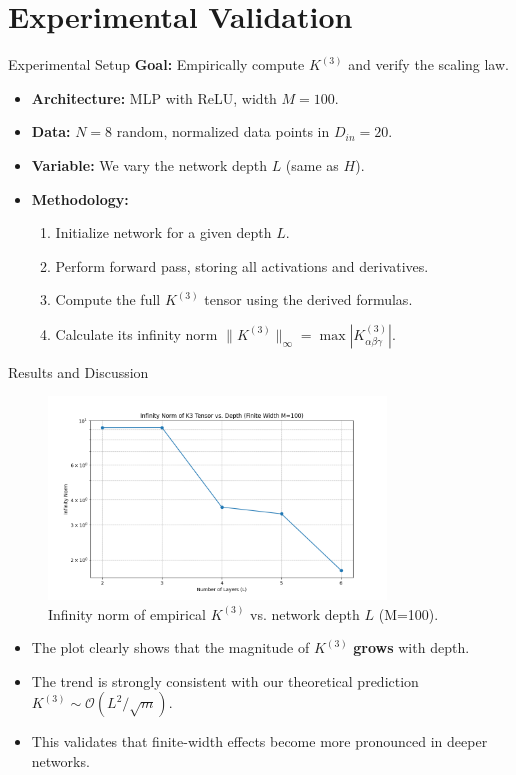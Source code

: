 \documentclass{beamer}
\newcommand{\Order}{\mathcal{O}}
\begin{document}
\section{Experimental Validation}

\begin{frame}{Experimental Setup}
\textbf{Goal:} Empirically compute $K^{(3)}$ and verify the scaling law.
\begin{itemize}
    \item \textbf{Architecture:} MLP with ReLU, width $M=100$.
    \item \textbf{Data:} $N=8$ random, normalized data points in $D_{in}=20$.
    \item \textbf{Variable:} We vary the network depth $L$ (same as $H$).
    \item \textbf{Methodology:}
        \begin{enumerate}
            \item Initialize network for a given depth $L$.
            \item Perform forward pass, storing all activations and derivatives.
            \item Compute the full $K^{(3)}$ tensor using the derived formulas.
            \item Calculate its infinity norm $\|K^{(3)}\|_\infty = \max |K^{(3)}_{\alpha\beta\gamma}|$.
        \end{enumerate}
\end{itemize}
\end{frame}

\begin{frame}{Results and Discussion}
\begin{figure}[h]
    \centering
    \includegraphics[width=0.8\textwidth]{../../../experiments/plots/k3_inf_norm_vs_L_finite_M100_N8_D20.png}
    \caption{Infinity norm of empirical $K^{(3)}$ vs. network depth $L$ (M=100).}
    \label{fig:k3_norm_vs_l}
\end{figure}
\begin{itemize}
    \item The plot clearly shows that the magnitude of $K^{(3)}$ \textbf{grows} with depth.
    \item The trend is strongly consistent with our theoretical prediction $K^{(3)} \sim \Order(L^2/\sqrt{m})$.
    \item This validates that finite-width effects become more pronounced in deeper networks.
\end{itemize}
\end{frame}
\end{document}
